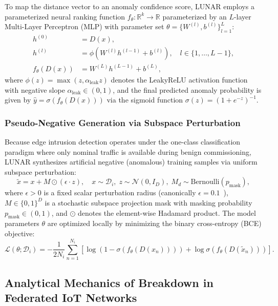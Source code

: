 To map the distance vector to an anomaly confidence score, LUNAR employs a parameterized neural ranking function $f_\theta: \mathbb{R}^k \to \mathbb{R}$ parameterized by an $L$-layer Multi-Layer Perceptron (MLP) with parameter set $\theta = \{W^{(l)}, b^{(l)}\}_{l=1}^L$:
\begin{align}
h^{(0)} &= D(x), \\
h^{(l)} &= \phi\left(W^{(l)} h^{(l-1)} + b^{(l)}\right), \quad l \in \{1, \dots, L-1\}, \\
f_\theta(D(x)) &= W^{(L)} h^{(L-1)} + b^{(L)},
\end{align}
where $\phi(z) = \max(z, \alpha_{\text{leak}} z)$ denotes the LeakyReLU activation function with negative slope $\alpha_{\text{leak}} \in (0, 1)$, and the final predicted anomaly probability is given by $\hat{y} = \sigma(f_\theta(D(x)))$ via the sigmoid function $\sigma(z) = (1 + e^{-z})^{-1}$.

\subsubsection{Pseudo-Negative Generation via Subspace Perturbation}
Because edge intrusion detection operates under the one-class classification paradigm where only nominal traffic is available during benign commissioning, LUNAR synthesizes artificial negative (anomalous) training samples via uniform subspace perturbation:
\begin{equation}
\label{eq:lunar_perturbation}
\tilde{x} = x + M \odot (\epsilon \cdot z), \quad x \sim \mathcal{D}_i, \; z \sim \mathcal{N}(0, I_D), \; M_d \sim \text{Bernoulli}(p_{\text{mask}}),
\end{equation}
where $\epsilon > 0$ is a fixed scalar perturbation radius (canonically $\epsilon = 0.1$~\cite{goodge2022lunar}), $M \in \{0, 1\}^D$ is a stochastic subspace projection mask with masking probability $p_{\text{mask}} \in (0, 1)$, and $\odot$ denotes the element-wise Hadamard product. The model parameters $\theta$ are optimized locally by minimizing the binary cross-entropy (BCE) objective:
\begin{equation}
\label{eq:bce_loss}
\mathcal{L}(\theta; \mathcal{D}_i) = -\frac{1}{2 N_i} \sum_{n=1}^{N_i} \left[ \log\left(1 - \sigma(f_\theta(D(x_n)))\right) + \log \sigma\left(f_\theta(D(\tilde{x}_n))\right) \right].
\end{equation}

\subsection{Analytical Mechanics of Breakdown in Federated IoT Networks}
\label{subsec:breakdown_mechanics}

